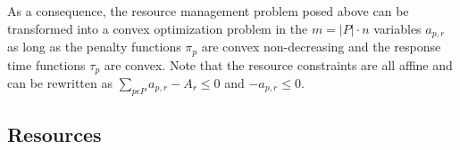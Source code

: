 As a consequence, the resource management problem posed above can be transformed into a convex optimization problem in the $m = |P|\cdot n$ variables $a_{p,r}$ as long as the penalty functions $\pi_p$ are convex non-decreasing and the response time functions $\tau_p$ are convex.
Note that the resource constraints are all affine and can be rewritten as
$\sum_{p\epsilon P} a_{p,r} - A_r \leq 0$ and $-a_{p,r} \leq 0$.

\subsection*{Resources}

